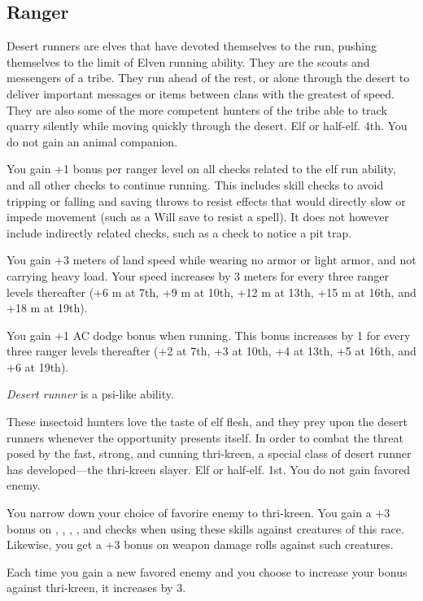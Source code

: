 \subsection{Ranger}
{Desert runners are elves that have devoted themselves to the run, pushing themselves to the limit of Elven running ability. They are the scouts and messengers of a tribe. They run ahead of the rest, or alone through the desert to deliver important messages or items between clans with the greatest of speed. They are also some of the more competent hunters of the tribe able to track quarry silently while moving quickly through the desert.}
{Elf or half-elf.}
{4th.}
{You do not gain an animal companion.}
{
	You gain +1 bonus per ranger level on all  checks related to the elf run ability, and all other checks to continue running. This includes skill checks to avoid tripping or falling and saving throws to resist effects that would directly slow or impede movement (such as a Will save to resist a  spell). It does not however include indirectly related checks, such as a  check to notice a pit trap.

	You gain +3 meters of land speed while wearing no armor or light armor, and not carrying heavy load. Your speed increases by 3 meters for every three ranger levels thereafter (+6 m at 7th, +9 m at 10th, +12 m at 13th, +15 m at 16th, and +18 m at 19th).

	You gain +1 AC dodge bonus when running. This bonus increases by 1 for every three ranger levels thereafter (+2 at 7th, +3 at 10th, +4 at 13th, +5 at 16th, and +6 at 19th).

	\emph{Desert runner} is a psi-like ability.
}
{These insectoid hunters love the taste of elf flesh, and they prey upon the desert runners whenever the  opportunity presents itself. In order to combat the threat posed by the fast, strong, and cunning thri-kreen, a special class of desert runner has developed---the thri-kreen slayer.}
{Elf or half-elf.}
{1st.}
{You do not gain favored enemy.}
{
	You narrow down your choice of favorire enemy to thri-kreen. You gain a +3 bonus on , , , , and  checks when using these skills against creatures of this race. Likewise, you get a +3 bonus on weapon damage rolls against such creatures.

	Each time you gain a new favored enemy and you choose to increase your bonus against thri-kreen, it increases by 3.
}
